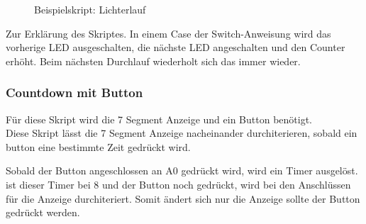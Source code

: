 \begin{figure}[H]

\caption{Beispielskript: Lichterlauf}
\label{output}
\end{figure}
Zur Erklärung des Skriptes. In einem Case der Switch-Anweisung wird das
vorherige LED ausgeschalten, die nächste LED angeschalten und den Counter
erhöht. Beim nächsten Durchlauf wiederholt sich das immer wieder.

\subsubsection{Countdown mit Button}
Für diese Skript wird die 7 Segment Anzeige und ein Button benötigt.\\
Diese Skript lässt die 7 Segment Anzeige nacheinander durchiterieren, sobald
ein button eine bestimmte Zeit gedrückt wird.



Sobald der Button angeschlossen an A0 gedrückt wird, wird ein Timer ausgelöst.
ist dieser Timer bei 8 und der Button noch gedrückt, wird bei den Anschlüssen
für die Anzeige durchiteriert. Somit ändert sich nur die Anzeige sollte der
Button gedrückt werden. 
